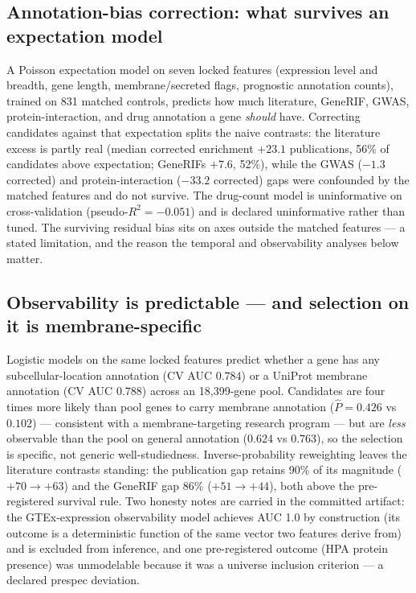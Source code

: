 \documentclass[11pt]{article}
\begin{document}
\subsection{Annotation-bias correction: what survives an expectation model}
A Poisson expectation model on seven locked features (expression level and
breadth, gene length, membrane/secreted flags, prognostic annotation counts),
trained on 831 matched controls, predicts how much literature, GeneRIF, GWAS,
protein-interaction, and drug annotation a gene \emph{should} have. Correcting
candidates against that expectation splits the naive contrasts: the literature
excess is partly real (median corrected enrichment $+23.1$ publications, 56\%
of candidates above expectation; GeneRIFs $+7.6$, 52\%), while the GWAS
($-1.3$ corrected) and protein-interaction ($-33.2$ corrected) gaps were
confounded by the matched features and do not survive. The drug-count model is
uninformative on cross-validation (pseudo-$R^2=-0.051$) and is declared
uninformative rather than tuned. The surviving residual bias sits on axes
outside the matched features --- a stated limitation, and the reason the
temporal and observability analyses below matter.

\subsection{Observability is predictable --- and selection on it is membrane-specific}
Logistic models on the same locked features predict whether a gene has any
subcellular-location annotation (CV AUC $0.784$) or a UniProt membrane
annotation (CV AUC $0.788$) across an 18{,}399-gene pool. Candidates are
four times more likely than pool genes to carry membrane annotation
($\hat{P}=0.426$ vs $0.102$) --- consistent with a membrane-targeting research
program --- but are \emph{less} observable than the pool on general annotation
($0.624$ vs $0.763$), so the selection is specific, not generic
well-studiedness. Inverse-probability reweighting leaves the literature
contrasts standing: the publication gap retains 90\% of its magnitude
($+70\to+63$) and the GeneRIF gap 86\% ($+51\to+44$), both above the
pre-registered survival rule. Two honesty notes are carried in the committed
artifact: the GTEx-expression observability model achieves AUC 1.0 by
construction (its outcome is a deterministic function of the same vector two
features derive from) and is excluded from inference, and one pre-registered
outcome (HPA protein presence) was unmodelable because it was a universe
inclusion criterion --- a declared prespec deviation.
\end{document}
